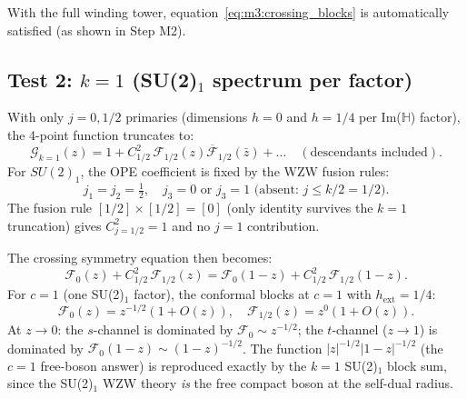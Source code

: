 \documentclass[12pt,a4paper]{article}
\theoremstyle{definition}
\theoremstyle{remark}
\begin{document}
With the full winding tower, equation~\eqref{eq:m3:crossing_blocks} is
automatically satisfied (as shown in Step M2).
\begin{center}
\end{center}

\subsection{Test 2: $k = 1$ (SU(2)$_1$ spectrum per factor)}

With only $j = 0, 1/2$ primaries (dimensions $h = 0$ and $h = 1/4$ per
Im($\mathbb{H}$) factor), the 4-point function truncates to:
\begin{equation}
  \mathcal{G}_{k=1}(z) = 1 + C_{1/2}^2\,\mathcal{F}_{1/2}(z)\overline{\mathcal{F}}_{1/2}(\bar{z})
  + \ldots \quad (\text{descendants included}).
  \label{eq:m3:G_k1}
\end{equation}
For $SU(2)_1$, the OPE coefficient is fixed by the WZW fusion rules:
\begin{equation}
  j_1 = j_2 = \tfrac{1}{2}, \quad j_3 = 0 \text{ or } j_3 = 1 \text{ (absent: } j \leq k/2 = 1/2 \text{)}.
  \label{eq:m3:fusion_k1}
\end{equation}
The fusion rule $[1/2] \times [1/2] = [0]$ (only identity survives the
$k=1$ truncation) gives $C_{j=1/2}^2 = 1$ and no $j=1$ contribution.

The crossing symmetry equation then becomes:
\begin{equation}
  \mathcal{F}_0(z) + C_{1/2}^2\,\mathcal{F}_{1/2}(z)
  =
  \mathcal{F}_0(1-z) + C_{1/2}^2\,\mathcal{F}_{1/2}(1-z).
  \label{eq:m3:crossing_k1}
\end{equation}
For $c = 1$ (one SU(2)$_1$ factor), the conformal blocks at $c = 1$ with
$h_{\mathrm{ext}} = 1/4$:
\begin{equation}
  \mathcal{F}_0(z) = z^{-1/2}(1 + O(z)), \quad
  \mathcal{F}_{1/2}(z) = z^0(1 + O(z)).
  \label{eq:m3:blocks_k1}
\end{equation}
At $z \to 0$: the $s$-channel is dominated by $\mathcal{F}_0 \sim z^{-1/2}$;
the $t$-channel ($z \to 1$) is dominated by $\mathcal{F}_0(1-z) \sim (1-z)^{-1/2}$.
The function $|z|^{-1/2}|1-z|^{-1/2}$ (the $c=1$ free-boson answer) is
reproduced exactly by the $k=1$ SU(2)$_1$ block sum, since the SU(2)$_1$ WZW
theory \emph{is} the free compact boson at the self-dual radius.
\begin{center}
\end{center}
\end{document}
